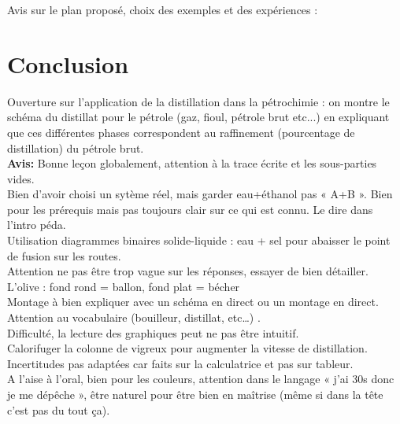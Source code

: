 \begin{reportBlock}{Avis sur le plan proposé, choix des exemples et des expériences : }
\section*{Conclusion}
Ouverture sur l'application de la distillation dans la pétrochimie : on montre le schéma du distillat pour le pétrole (gaz, fioul, pétrole brut etc...) en expliquant que ces différentes phases correspondent au raffinement (pourcentage de distillation) du pétrole brut.\\

\textbf{Avis:} Bonne leçon globalement, attention à la trace écrite et les sous-parties vides.\\
Bien d’avoir choisi un sytème réel, mais garder eau+éthanol pas « A+B ». Bien pour les prérequis mais pas toujours clair sur ce qui est connu. Le dire dans l’intro péda.\\
Utilisation diagrammes binaires solide-liquide : eau + sel pour abaisser le point de fusion sur les routes.\\
Attention ne pas être trop vague sur les réponses, essayer de bien détailler.\\
L’olive : fond rond = ballon, fond plat = bécher\\
Montage à bien expliquer avec un schéma en direct ou un montage en direct. Attention au vocabulaire (bouilleur, distillat, etc…) .\\
Difficulté, la lecture des graphiques peut ne pas être intuitif. \\
Calorifuger la colonne de vigreux pour augmenter la vitesse de distillation. \\
Incertitudes pas adaptées car faits sur la calculatrice et pas sur tableur.\\
A l’aise à l’oral, bien pour les couleurs, attention dans le langage « j’ai 30s donc je me dépêche », être naturel pour être bien en maîtrise (même si dans la tête c’est pas du tout ça).

\end{reportBlock}

